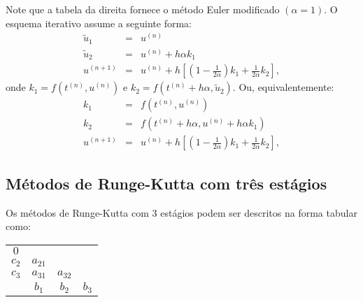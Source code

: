 Note que a tabela da direita fornece o método Euler modificado $\left(\alpha=1\right)$. O esquema iterativo assume a seguinte forma:
\begin{eqnarray}
  \tilde{u}_1 &=&u^{(n)} \\
  \tilde{u}_2 &=&u^{(n)}  +  h\alpha k_1 \\
  u^{(n+1)}&=&u^{(n)}  + h \left[ \left(1-\frac{1}{2\alpha}\right)k_1+\frac{1}{2\alpha} k_2\right],
\end{eqnarray}
onde $k_1=f(t^{(n)},u^{(n)})$ e $k_2=f(t^{(n)}+h\alpha,\tilde{u}_2)$. Ou, equivalentemente:
\begin{eqnarray}
k_1&=&f(t^{(n)},u^{(n)})\\
k_2&=&f(t^{(n)}+h\alpha,u^{(n)}  +  h\alpha k_1)\\
  u^{(n+1)}&=&u^{(n)}  + h \left[\left (1-\frac{1}{2\alpha}\right)k_1+\frac{1}{2\alpha} k_2\right],
\end{eqnarray}


\subsection{Métodos de Runge-Kutta com três estágios}\label{pvi:RK_3_subsec}
Os métodos de Runge-Kutta com 3 estágios podem ser descritos na forma tabular como:
\begin{center}
\begin{tabular}{c|ccc}
  $0$              &          &               & \\
  $c_2$            & $a_{21}$ &               & \\
  $c_3$            & $a_{31}$ & $a_{32}$      & \\  \hline
                   & $b_{1}$  & $b_{2}$       & $b_{3}$
\end{tabular}
\end{center}


